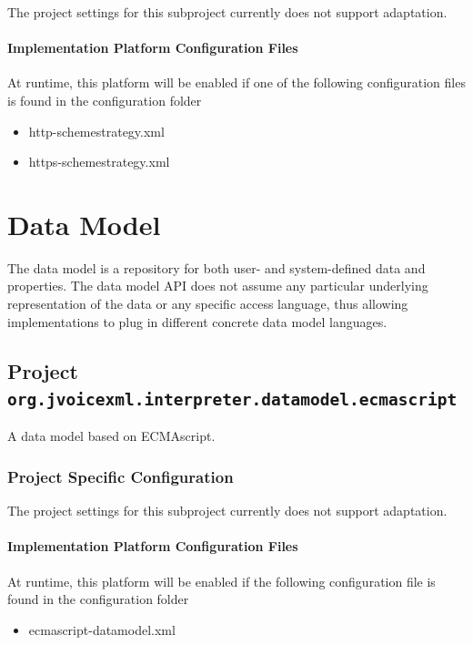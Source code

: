 \documentclass[11pt,a4paper]{article}
\begin{document}
The project settings for this subproject currently does not support adaptation.

\paragraph{Implementation Platform Configuration Files}

At runtime, this platform will be enabled if one of the following configuration files is found in the configuration
folder
\begin{itemize}
\item http-schemestrategy.xml
\item https-schemestrategy.xml
\end{itemize}

\section{Data Model}

The data model is a repository for both user- and system-defined data and properties.
The data model API does not assume any particular underlying
representation of the data or any specific access language, thus allowing
implementations to plug in different concrete data model languages.


\subsection{Project \texttt{org.jvoicexml.interpreter.datamodel.ecmascript}}

A data model based on ECMAscript.

\subsubsection{Project Specific Configuration}

The project settings for this subproject currently does not support adaptation.

\paragraph{Implementation Platform Configuration Files}

At runtime, this platform will be enabled if the following configuration file is found in the configuration
folder
\begin{itemize}
\item ecmascript-datamodel.xml
\end{itemize}
\end{document}
